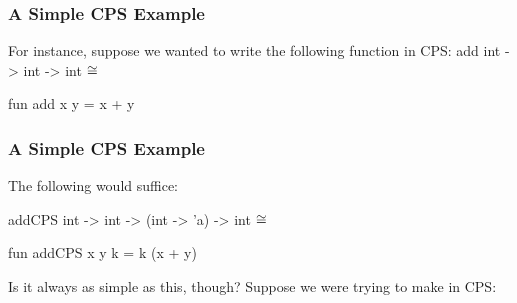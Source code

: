 \documentclass[aspectratio=169, handout]{beamer}
\begin{document}
\begin{comment}
\begin{frame}[fragile]
  \frametitle{Continuation-Passing Type Signatures}

  We see that this transformation witnesses the fact that the \code{|>} operator
  is just the identity function, equipped with a continuation.

  \pause
  \vspace{\fill}

  Consider the following function:
  \begin{codeblock}
    fun identity (x : 'a) : 'a = x
  \end{codeblock}

  \pause
  \vspace{\fill}

  What if we throw a continuation in there?

  \pause
  \vspace{\fill}

  \begin{codeblock}
    fun identityCPS (x : 'a) (k : 'a -> 'b): 'b = k x

    infix |>
    fun x |> f = identityCPS x f
  \end{codeblock}
\end{frame}
\end{comment}

\begin{frame}[fragile]
  \frametitle{A Simple CPS Example}

  For instance, suppose we wanted to write the following function in CPS:
  \spec
    {add}
    {int -> int -> int}
    {}
    { $\cong$ }

  \pause
  \vspace{\fill}
 
  \begin{codeblock}
    fun add x y = x + y
  \end{codeblock}
\end{frame}

\begin{frame}[fragile]
  \frametitle{A Simple CPS Example}

  The following would suffice:

  \spec
    {addCPS}
    {int -> int -> (int -> 'a) -> int}
    {}
    { $\cong$ }

  \pause
  \vspace{\fill}

  \begin{codeblock}
    fun addCPS x y k = k (x + y)
  \end{codeblock}

  \pause
  \vspace{\fill}
  
  Is it always as simple as this, though? Suppose we were trying to
  make  in CPS:
\end{frame}
\end{document}
